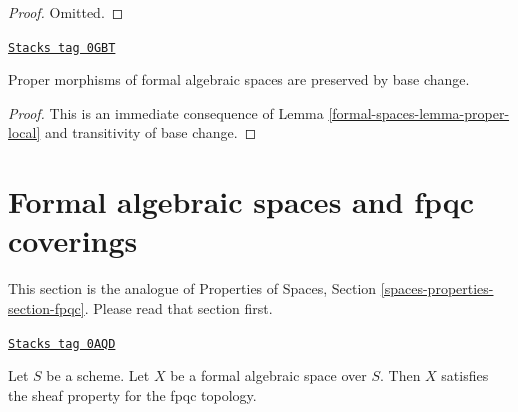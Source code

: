 \begin{proof}
Omitted.
\end{proof}

\begin{lemma}
\label{formal-spaces-lemma-base-change-proper}
\href{https://stacks.math.columbia.edu/tag/0GBT}{\texttt{Stacks tag 0GBT}}

Proper morphisms of formal algebraic spaces are preserved by base change.
\end{lemma}

\begin{proof}
This is an immediate consequence of Lemma \ref{formal-spaces-lemma-proper-local}
and transitivity of base change.
\end{proof}

\section{Formal algebraic spaces and fpqc coverings}
\label{formal-spaces-section-fpqc}
This section is the analogue of Properties of Spaces, Section
\ref{spaces-properties-section-fpqc}. Please read that section
first.

\begin{lemma}
\label{formal-spaces-lemma-sheaf-fpqc}
\href{https://stacks.math.columbia.edu/tag/0AQD}{\texttt{Stacks tag 0AQD}}


Let $S$ be a scheme. Let $X$ be a formal algebraic space over $S$. Then
$X$ satisfies the sheaf property for the fpqc topology.
\end{lemma}

